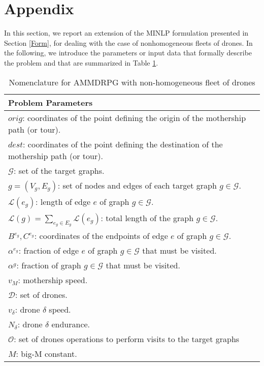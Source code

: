 \section{Appendix}\label{App}
\noindent
In this section, we report an extension of the MINLP formulation presented in Section \ref{Form}, for dealing with the case of nonhomogeneous fleets of drones.
\noindent
In the following, we introduce the parameters or input data that formally describe the problem and that are summarized in Table \ref{table:At1}.
\noindent
{}

\begin{table}[!h]
\scriptsize
\centering
\begin{tabular}{ | l | }
\hline
\textbf{Problem Parameters}\\
\hline
$orig$: coordinates of the point defining the origin of the mothership path (or tour).\\
$dest$: coordinates of the point defining the destination of the mothership path (or tour).\\
$\mathcal{G}$: set of the target graphs.\\
$g = (V_g, E_g)$: set of nodes and edges of each target graph $g \in \mathcal{G}$.\\
$\mathcal{L}(e_g)$: length of edge $e$ of graph $g \in \mathcal{G}$.\\
$\mathcal{L}(g)=\sum_{e_g\in E_g} \mathcal L(e_g)$: total length of the graph $g\in\mathcal G$.\\
$B^{e_g}, C^{e_g}$: coordinates of the endpoints of edge $e$ of graph $g \in \mathcal{G}$.\\
$\alpha^{e_g}$: fraction of edge $e$ of graph $g \in \mathcal{G}$ that must be visited.\\
$\alpha^{g}$: fraction of graph $g \in \mathcal{G}$ that must be visited.\\
$v_M$: mothership speed.\\
$\mathcal D$: set of drones.\\
$v_\delta$: drone $\delta$ speed.\\
$N_\delta$: drone $\delta$ endurance. \\
$\mathcal{O}$: set of drones operations to perform visits to the target graphs\\
$M$: big-M constant.\\
\hline
\end{tabular}
\caption{Nomenclature for AMMDRPG with non-homogeneous fleet of drones}
\label{table:At1}
\end{table}

